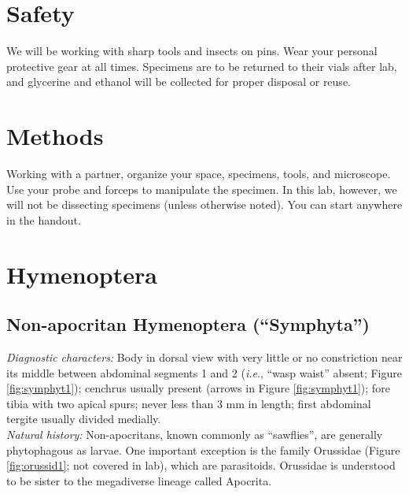 \documentclass[letterpaper, 11pt]{article}
\begin{document}
\section*{Safety}
We will be working with sharp tools and insects on pins. Wear your personal protective gear at all times. Specimens are to be returned to their vials after lab, and glycerine and ethanol will be collected for proper disposal or reuse.

\section*{Methods}
Working with a partner, organize your space, specimens, tools, and microscope. Use your probe and forceps to manipulate the specimen. In this lab, however, we will not be dissecting specimens (unless otherwise noted). You can start anywhere in the handout.

\section{Hymenoptera}
\subsection{Non-apocritan Hymenoptera (``Symphyta'')}
\noindent{}\textit{Diagnostic characters:} Body in dorsal view with very little or no constriction near its middle between abdominal segments 1 and 2 (\textit{i.e}., ``wasp waist'' absent; Figure \ref{fig:symphyt1}); cenchrus usually present (arrows in Figure \ref{fig:symphyt1}); fore tibia with two apical spurs; never less than 3 mm in length; first abdominal tergite usually divided medially.\\

\noindent{}\textit{Natural history:} Non-apocritans, known commonly as ``sawflies'', are generally phytophagous as larvae. One important exception is the family Orussidae (Figure \ref{fig:orussid1}; not covered in lab), which are parasitoids. Orussidae is understood to be sister to the megadiverse lineage called Apocrita.
\end{document}

